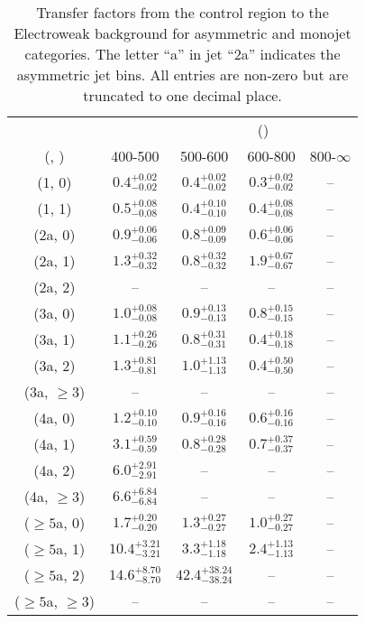 \begin{table}[h!]
\tiny
\centering
\caption{Transfer factors from the \gj control region to the Electroweak background for asymmetric and monojet categories. The letter ``a'' in jet \eg ``2a''  indicates the asymmetric jet bins. All entries are non-zero but are truncated to one decimal place.\label{tab:tf_gj_total_asym}}
\begin{tabular}
{ccccc}
	\hline\hline
&	& \multicolumn{4}{c}{\scalht (\gev)} \\ 
	 (\njet,  \nb) & 400-500 & 500-600 & 600-800 & 800-$\infty$ \\ [0.8ex] 
\hline
	(1, 0) & $0.4^{+ 0.02 }_{- 0.02 }$ & $0.4^{+ 0.02 }_{- 0.02 }$ & $0.3^{+ 0.02 }_{- 0.02 }$ & -- \\[0.5ex] 
	(1, 1) & $0.5^{+ 0.08 }_{- 0.08 }$ & $0.4^{+ 0.10 }_{- 0.10 }$ & $0.4^{+ 0.08 }_{- 0.08 }$ & -- \\[0.5ex] 
	(2a, 0) & $0.9^{+ 0.06 }_{- 0.06 }$ & $0.8^{+ 0.09 }_{- 0.09 }$ & $0.6^{+ 0.06 }_{- 0.06 }$ & -- \\[0.5ex] 
	(2a, 1) & $1.3^{+ 0.32 }_{- 0.32 }$ & $0.8^{+ 0.32 }_{- 0.32 }$ & $1.9^{+ 0.67 }_{- 0.67 }$ & -- \\[0.5ex] 
	(2a, 2) & -- & -- & -- & -- \\[0.5ex] 
	(3a, 0) & $1.0^{+ 0.08 }_{- 0.08 }$ & $0.9^{+ 0.13 }_{- 0.13 }$ & $0.8^{+ 0.15 }_{- 0.15 }$ & -- \\[0.5ex] 
	(3a, 1) & $1.1^{+ 0.26 }_{- 0.26 }$ & $0.8^{+ 0.31 }_{- 0.31 }$ & $0.4^{+ 0.18 }_{- 0.18 }$ & -- \\[0.5ex] 
	(3a, 2) & $1.3^{+ 0.81 }_{- 0.81 }$ & $1.0^{+ 1.13 }_{- 1.13 }$ & $0.4^{+ 0.50 }_{- 0.50 }$ & -- \\[0.5ex] 
	(3a, $\ge3$) & -- & -- & -- & -- \\[0.5ex] 
	(4a, 0) & $1.2^{+ 0.10 }_{- 0.10 }$ & $0.9^{+ 0.16 }_{- 0.16 }$ & $0.6^{+ 0.16 }_{- 0.16 }$ & -- \\[0.5ex] 
	(4a, 1) & $3.1^{+ 0.59 }_{- 0.59 }$ & $0.8^{+ 0.28 }_{- 0.28 }$ & $0.7^{+ 0.37 }_{- 0.37 }$ & -- \\[0.5ex] 
	(4a, 2) & $6.0^{+ 2.91 }_{- 2.91 }$ & -- & -- & -- \\[0.5ex] 
	(4a, $\ge3$) & $6.6^{+ 6.84 }_{- 6.84 }$ & -- & -- & -- \\[0.5ex] 
	($\ge5$a, 0) & $1.7^{+ 0.20 }_{- 0.20 }$ & $1.3^{+ 0.27 }_{- 0.27 }$ & $1.0^{+ 0.27 }_{- 0.27 }$ & -- \\[0.5ex] 
	($\ge5$a, 1) & $10.4^{+ 3.21 }_{- 3.21 }$ & $3.3^{+ 1.18 }_{- 1.18 }$ & $2.4^{+ 1.13 }_{- 1.13 }$ & -- \\[0.5ex] 
	($\ge5$a, 2) & $14.6^{+ 8.70 }_{- 8.70 }$ & $42.4^{+ 38.24 }_{- 38.24 }$ & -- & -- \\[0.5ex] 
	($\ge5$a, $\ge3$) & -- & -- & -- & -- \\[0.5ex] 
	\hline
	\hline
\end{tabular}
\end{table}
